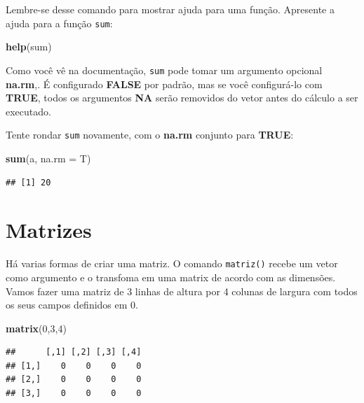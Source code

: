 \documentclass[
]{book}
\newenvironment{Shaded}{\begin{snugshade}}{\end{snugshade}}
\newcommand{\DataTypeTok}[1]{\textcolor[rgb]{0.13,0.29,0.53}{#1}}
\newcommand{\DecValTok}[1]{\textcolor[rgb]{0.00,0.00,0.81}{#1}}
\newcommand{\KeywordTok}[1]{\textcolor[rgb]{0.13,0.29,0.53}{\textbf{#1}}}
\newcommand{\NormalTok}[1]{#1}
\begin{document}
Lembre-se desse comando para mostrar ajuda para uma função. Apresente a ajuda para a função \texttt{sum}:

\begin{Shaded}
\begin{Highlighting}[]
\KeywordTok{help}\NormalTok{(sum)}
\end{Highlighting}
\end{Shaded}

Como você vê na documentação, \texttt{sum} pode tomar um argumento opcional \textbf{na.rm},. É configurado \textbf{FALSE} por padrão, mas se você configurá-lo com \textbf{TRUE}, todos os argumentos \textbf{NA} serão removidos do vetor antes do cálculo a ser executado.

Tente rondar \texttt{sum} novamente, com o \textbf{na.rm} conjunto para \textbf{TRUE}:

\begin{Shaded}
\begin{Highlighting}[]
\KeywordTok{sum}\NormalTok{(a, }\DataTypeTok{na.rm =}\NormalTok{ T)}
\end{Highlighting}
\end{Shaded}

\begin{verbatim}
## [1] 20
\end{verbatim}

\hypertarget{matrizes}{%
\section{Matrizes}\label{matrizes}}

Há varias formas de criar uma matriz. O comando \texttt{matriz()} recebe um vetor como argumento e o transfoma em uma matrix de acordo com as dimensões.
Vamos fazer uma matriz de 3 linhas de altura por 4 colunas de largura com todos os seus campos definidos em 0.

\begin{Shaded}
\begin{Highlighting}[]
\KeywordTok{matrix}\NormalTok{(}\DecValTok{0}\NormalTok{,}\DecValTok{3}\NormalTok{,}\DecValTok{4}\NormalTok{)}
\end{Highlighting}
\end{Shaded}

\begin{verbatim}
##      [,1] [,2] [,3] [,4]
## [1,]    0    0    0    0
## [2,]    0    0    0    0
## [3,]    0    0    0    0
\end{verbatim}
\end{document}
